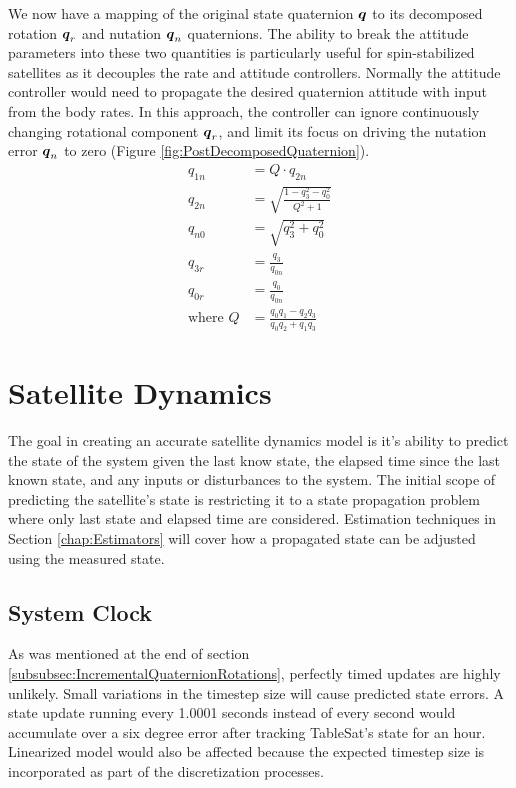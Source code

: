 We now have a mapping of the original state quaternion $\boldsymbol{q}$ to its decomposed rotation $\boldsymbol{q}_r$ and nutation $\boldsymbol{q}_n$ quaternions.  The ability to break the attitude parameters into these two quantities is particularly useful for spin-stabilized satellites as it decouples the rate and attitude controllers.  Normally the attitude controller would need to propagate the desired quaternion attitude with input from the body rates. In this approach, the controller can ignore continuously changing rotational component $\boldsymbol{q}_r$, and limit its focus on driving the nutation error $\boldsymbol{q}_n$ to zero (Figure \ref{fig:PostDecomposedQuaternion}).
\begin{subequations}
  \begin{align}
    q_{1n} &= Q \cdot q_{2n} \\
    q_{2n} &= \sqrt{ \frac{1  - q_3^2 - q_0^2}{Q^2 + 1} }\\
    q_{n0} &= \sqrt{q_3^2 + q_0^2} \\
    q_{3r} &= \frac{q_3}{q_{0n}} \\
    q_{0r} &= \frac{q_0}{q_{0n}} \\
    \text{where } Q &= \frac{q_{0}q_{1} - q_{2}q_{3}}{q_{0}q_{2} + q_{1}q_{3}}
  \end{align}
\end{subequations}


\section{Satellite Dynamics}
\label{sec:SatelliteDynamics}

The goal in creating an accurate satellite dynamics model is it's ability to predict the state of the system given the last know state, the elapsed time since the last known state, and any inputs or disturbances to the system.  The initial scope of predicting the satellite's state is restricting it to a state propagation problem where only last state and elapsed time are considered.  Estimation techniques in Section \ref{chap:Estimators} will cover how a propagated state can be adjusted using the measured state.

\subsection{System Clock}
\label{subsec:SystemClock}

As was mentioned at the end of section \ref{subsubsec:IncrementalQuaternionRotations}, perfectly timed updates are highly unlikely.  Small variations in the timestep size will cause predicted state errors.  A state update running every 1.0001 seconds instead of every second would accumulate over a six degree error after tracking TableSat's state for an hour.  Linearized model would also be affected because the expected timestep size is incorporated as part of the discretization processes.

